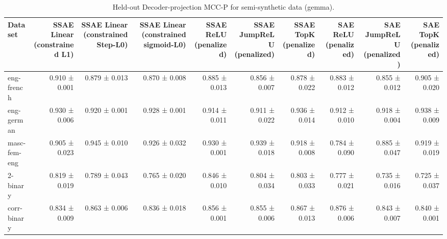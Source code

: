 \begin{table}[t]
\centering
\caption{Held-out Decoder-projection MCC-P for semi-synthetic data (gemma).}
\label{tab:semisynthetic-gemma-decoder-projection-mcc-p}
\begin{tabular}{lrrrrrrrrr}
\toprule
Dataset & SSAE Linear (constrained L1) & SSAE Linear (constrained Step-L0) & SSAE Linear (constrained sigmoid-L0) & SSAE ReLU (penalized) & SSAE JumpReLU (penalized) & SSAE TopK (penalized) & SAE ReLU (penalized) & SAE JumpReLU (penalized) & SAE TopK (penalized) \\
\midrule
eng-french & 0.910 ± 0.001 & 0.879 ± 0.013 & 0.870 ± 0.008 & 0.885 ± 0.013 & 0.856 ± 0.007 & 0.878 ± 0.022 & 0.883 ± 0.012 & 0.855 ± 0.012 & 0.905 ± 0.020 \\
eng-german & 0.930 ± 0.006 & 0.920 ± 0.001 & 0.928 ± 0.001 & 0.914 ± 0.011 & 0.911 ± 0.022 & 0.936 ± 0.014 & 0.912 ± 0.010 & 0.918 ± 0.004 & 0.938 ± 0.009 \\
masc-fem-eng & 0.905 ± 0.023 & 0.945 ± 0.010 & 0.926 ± 0.032 & 0.930 ± 0.001 & 0.939 ± 0.018 & 0.918 ± 0.008 & 0.784 ± 0.090 & 0.885 ± 0.047 & 0.919 ± 0.019 \\
2-binary & 0.819 ± 0.019 & 0.789 ± 0.043 & 0.765 ± 0.020 & 0.846 ± 0.010 & 0.804 ± 0.034 & 0.803 ± 0.033 & 0.777 ± 0.021 & 0.735 ± 0.016 & 0.725 ± 0.037 \\
corr-binary & 0.834 ± 0.009 & 0.863 ± 0.006 & 0.836 ± 0.018 & 0.856 ± 0.001 & 0.855 ± 0.006 & 0.867 ± 0.013 & 0.876 ± 0.006 & 0.843 ± 0.007 & 0.840 ± 0.001 \\
\bottomrule
\end{tabular}
\end{table}
